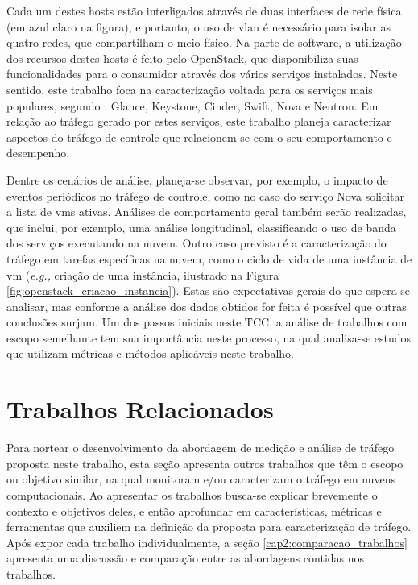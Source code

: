 Cada um destes hosts estão interligados através de duas interfaces de rede física (em azul claro na figura), e portanto, o uso de \ac{vlan} é necessário para isolar as quatro redes, que compartilham o meio físico. %
%
Na parte de software, a utilização dos recursos destes hosts é feito pelo OpenStack, que disponibiliza suas funcionalidades para o consumidor através dos vários serviços instalados.
%
Neste sentido, este trabalho foca na caracterização voltada para os serviços mais populares, segundo : Glance, Keystone, Cinder, Swift, Nova e Neutron.
%
Em relação ao tráfego gerado por estes serviços, este trabalho planeja caracterizar aspectos do tráfego de controle que relacionem-se com o seu comportamento e desempenho.

Dentre os cenários de análise, planeja-se observar, por exemplo, o impacto de eventos periódicos no tráfego de controle, como no caso do serviço Nova solicitar a lista de \acp{vm} ativas.
%
Análises de comportamento geral também serão realizadas, que inclui, por exemplo, uma análise longitudinal, classificando o uso de banda dos serviços executando na nuvem.
%
Outro caso previsto é a caracterização do tráfego em tarefas específicas na nuvem, como o ciclo de vida de uma instância de \ac{vm} (\textit{e.g.,} criação de uma instância, ilustrado na Figura \ref{fig:openstack_criacao_instancia}).
%
Estas são expectativas gerais do que espera-se analisar, mas conforme a análise dos dados obtidos for feita é possível que outras conclusões surjam.
%
Um dos passos iniciais neste TCC, a análise de trabalhos com escopo semelhante tem sua importância neste processo, na qual analisa-se estudos que utilizam métricas e métodos aplicáveis neste trabalho.

\section{Trabalhos Relacionados}
\label{cap2:relacionados}

Para nortear o desenvolvimento da abordagem de medição e análise de tráfego proposta neste trabalho, esta seção apresenta outros trabalhos que têm o escopo ou objetivo similar, na qual monitoram e/ou caracterizam o tráfego em nuvens computacionais.
%
Ao apresentar os trabalhos busca-se explicar brevemente o contexto e objetivos deles, e então aprofundar em características, métricas e ferramentas que auxiliem na definição da proposta para caracterização de tráfego.
%
Após expor cada trabalho individualmente, a seção \ref{cap2:comparacao_trabalhos} apresenta uma discussão e comparação entre as abordagens contidas nos trabalhos.

